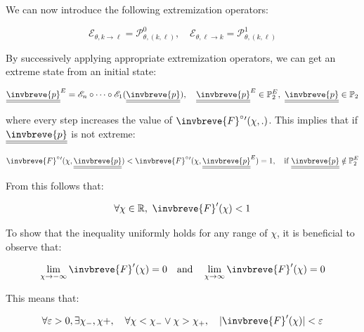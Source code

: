\documentclass{article}
\theoremstyle{definition}
\begin{document}
We can now introduce the following extremization operators:

\begin{equation}
    \mathscr{E}_{\theta, k \to \ell} = \mathscr{P}_{\theta,(k,\ell)}^0 , \quad
    \mathscr{E}_{\theta, \ell \to k} = \mathscr{P}_{\theta,(k,\ell)}^1
\end{equation}

By successively applying appropriate extremization operators, we can get an extreme state from an initial state:

\begin{equation}
    \underline{\underline{\invbreve{p}}}^E = \mathscr{E}_n \circ \dots \circ \mathscr{E}_1(\underline{\underline{\invbreve{p}}}), \quad
    \underline{\underline{\invbreve{p}}}^E \in \mathbb{P}_2^E, \ 
    \underline{\underline{\invbreve{p}}} \in \mathbb{P}_2
\end{equation}

where every step increases the value of $\invbreve{F}^\circ{}'(\chi,.)$.
This implies that if $\underline{\underline{\invbreve{p}}}$ is not extreme:

\begin{equation}
    \invbreve{F}^\circ{}'(\chi,\underline{\underline{\invbreve{p}}}) <
    \invbreve{F}^\circ{}'(\chi,\underline{\underline{\invbreve{p}}}^E) = 1, \quad \text{if} \ \underline{\underline{\invbreve{p}}} \notin \mathbb{P}_2^E
\end{equation}

From this follows that:

\begin{equation}
    \forall \chi \in \mathbb{R}, \ \invbreve{F}'(\chi) < 1
\end{equation}

To show that the inequality uniformly holds for any range of $\chi$, it is beneficial to observe that:

\begin{equation}
    \lim_{\chi \to -\infty} \invbreve{F}'(\chi) =0 \quad \text{and} \quad  \lim_{\chi \to \infty} \invbreve{F}'(\chi) = 0
\end{equation}

This means that:

\begin{equation}
    \forall \varepsilon >0, \exists \chi_{-}, \chi{+}, \quad 
    \forall \chi < \chi_{-} \vee \chi > \chi_{+}, \quad
    |\invbreve{F}'(\chi)| < \varepsilon
\end{equation}
\end{document}
